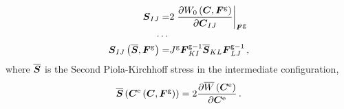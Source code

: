 \documentclass[10pt,letterpaper,oneside]{report}
\newcommand{\ten}[1]{\mbox{\boldmath $#1$}{}}
\newcommand{\scas}[1]{\mbox{{\scriptsize{${\rm{#1}}$}}}{}}
\newcommand{\tens}[1]{\mbox{\boldmath{\scriptsize{$#1$}}}{}}
\begin{document}
\begin{align}
\ten{S}_{IJ} 
=& 2 \left. \frac{\partial W_0 \left( \ten{C}, \ten{F}^{\scas{g}} \right) }{\partial \ten{C}_{IJ}} \right|_{\tens{F}^{\scas{g}}} 
\notag \\
\cdots{}& \notag \\
\ten{S}_{IJ} \left( \overline{\ten{S}}, \ten{F}^{\scas{g}} \right) =& J^{\scas{g}} \ten{F}^{\scas{g}-1}_{KI} \overline{\ten{S}}_{KL} \ten{F}^{\scas{g}-1}_{LJ} \, ,
\end{align}
where $\overline{\ten{S}}$ is the Second Piola-Kirchhoff stress in the intermediate configuration,
\begin{equation}
\overline{\ten{S}} \left( \ten{C}^{\scas{e}} \left( \ten{C}, \ten{F}^{\scas{g}} \right) \right)= 2 \frac{ \partial \overline{W} \left( \ten{C}^{\scas{e}} \right) }{ \partial \ten{C}^{\scas{e}} } \, .
\label{SPK_int}
\end{equation}
\end{document}

